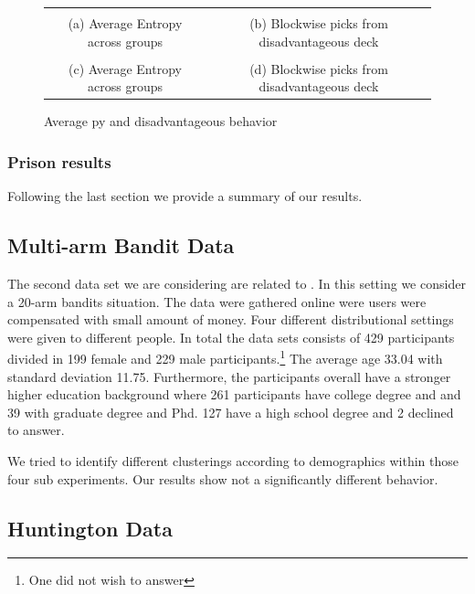 \documentclass[12pt,a4paper,bibliography=totocnumbered,listof=totocnumbered]{scrartcl}
\begin{document}
\setlength{\tabcolsep}{-0.2cm}
\renewcommand{\arraystretch}{-0.6}
\begin{figure}[!htbp]
	\small
	\begin{tabular}{cc}
	 &  \\
	(a) Average Entropy across groups & (b) Blockwise picks from disadvantageous deck \\
	 &  \\
	(c) Average Entropy across groups & (d) Blockwise picks from disadvantageous deck 
	\end{tabular}
	\caption{Average py and disadvantageous behavior}
	\label{fig:ent}
\end{figure}

\subsubsection{Prison results}

Following the last section we provide a summary of our results. 


\subsection{Multi-arm Bandit Data}

The second data set we are considering are related to \cite{Stojic2015}. In this setting we consider a 20-arm bandits situation. The data were gathered online were users were compensated with small amount of money. Four different distributional settings were given to different people. In total the data sets consists of 429 participants divided in 199 female and 229 male participants.\footnote{One did not wish to answer} The average age 33.04 with standard deviation 11.75. Furthermore, the participants overall have a stronger higher education background where 261 participants have college degree and and 39 with graduate degree and Phd. 127 have a high school degree and 2 declined to answer.

We tried to identify different clusterings according to demographics within those four sub experiments. Our results show not a significantly different behavior. 

\subsection{Huntington Data}
\end{document}
